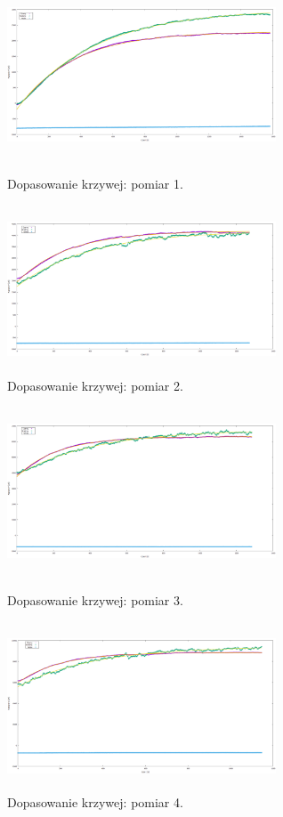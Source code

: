 \documentclass[10pt,a4paper]{article}
\begin{document}
\begin{figure}[h!]
\centering
\begin{minipage}{0.5\textwidth}
  \centering
  \includegraphics[width=8cm, height=5cm ]{rap11rys2} 
\caption{Dopasowanie krzywej: pomiar 1.}
\end{minipage}%
\begin{minipage}{0.5\textwidth}
  \centering
  \includegraphics[width=8cm, height=5cm ]{rap11rys3} 
\caption{Dopasowanie krzywej: pomiar 2.}
\end{minipage}
\end{figure}

\begin{figure}[h!]
\centering
\begin{minipage}{0.5\textwidth}
  \centering
  \includegraphics[width=8cm, height=5cm ]{rap11rys4} 
\caption{Dopasowanie krzywej: pomiar 3.}
\end{minipage}%
\begin{minipage}{0.5\textwidth}
  \centering
  \includegraphics[width=8cm, height=5cm ]{rap11rys5} 
\caption{Dopasowanie krzywej: pomiar 4.}
\end{minipage}
\end{figure}
 
\end{document}
